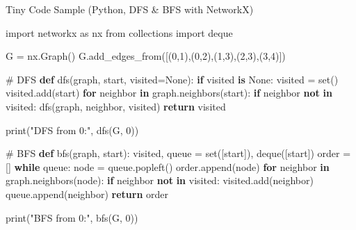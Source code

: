 \documentclass[
  letterpaper,
  DIV=11,
  numbers=noendperiod]{scrreprt}
\newenvironment{Shaded}{\begin{snugshade}}{\end{snugshade}}
\newcommand{\BuiltInTok}[1]{\textcolor[rgb]{0.00,0.23,0.31}{#1}}
\newcommand{\CommentTok}[1]{\textcolor[rgb]{0.37,0.37,0.37}{#1}}
\newcommand{\ControlFlowTok}[1]{\textcolor[rgb]{0.00,0.23,0.31}{\textbf{#1}}}
\newcommand{\DecValTok}[1]{\textcolor[rgb]{0.68,0.00,0.00}{#1}}
\newcommand{\ImportTok}[1]{\textcolor[rgb]{0.00,0.46,0.62}{#1}}
\newcommand{\KeywordTok}[1]{\textcolor[rgb]{0.00,0.23,0.31}{\textbf{#1}}}
\newcommand{\NormalTok}[1]{\textcolor[rgb]{0.00,0.23,0.31}{#1}}
\newcommand{\OperatorTok}[1]{\textcolor[rgb]{0.37,0.37,0.37}{#1}}
\newcommand{\StringTok}[1]{\textcolor[rgb]{0.13,0.47,0.30}{#1}}
\newcommand{\VariableTok}[1]{\textcolor[rgb]{0.07,0.07,0.07}{#1}}
\begin{document}
Tiny Code Sample (Python, DFS \& BFS with NetworkX)

\begin{Shaded}
\begin{Highlighting}[]
\ImportTok{import}\NormalTok{ networkx }\ImportTok{as}\NormalTok{ nx}
\ImportTok{from}\NormalTok{ collections }\ImportTok{import}\NormalTok{ deque}

\NormalTok{G }\OperatorTok{=}\NormalTok{ nx.Graph()}
\NormalTok{G.add\_edges\_from([(}\DecValTok{0}\NormalTok{,}\DecValTok{1}\NormalTok{),(}\DecValTok{0}\NormalTok{,}\DecValTok{2}\NormalTok{),(}\DecValTok{1}\NormalTok{,}\DecValTok{3}\NormalTok{),(}\DecValTok{2}\NormalTok{,}\DecValTok{3}\NormalTok{),(}\DecValTok{3}\NormalTok{,}\DecValTok{4}\NormalTok{)])}

\CommentTok{\# DFS}
\KeywordTok{def}\NormalTok{ dfs(graph, start, visited}\OperatorTok{=}\VariableTok{None}\NormalTok{):}
    \ControlFlowTok{if}\NormalTok{ visited }\KeywordTok{is} \VariableTok{None}\NormalTok{:}
\NormalTok{        visited }\OperatorTok{=} \BuiltInTok{set}\NormalTok{()}
\NormalTok{    visited.add(start)}
    \ControlFlowTok{for}\NormalTok{ neighbor }\KeywordTok{in}\NormalTok{ graph.neighbors(start):}
        \ControlFlowTok{if}\NormalTok{ neighbor }\KeywordTok{not} \KeywordTok{in}\NormalTok{ visited:}
\NormalTok{            dfs(graph, neighbor, visited)}
    \ControlFlowTok{return}\NormalTok{ visited}

\BuiltInTok{print}\NormalTok{(}\StringTok{"DFS from 0:"}\NormalTok{, dfs(G, }\DecValTok{0}\NormalTok{))}

\CommentTok{\# BFS}
\KeywordTok{def}\NormalTok{ bfs(graph, start):}
\NormalTok{    visited, queue }\OperatorTok{=} \BuiltInTok{set}\NormalTok{([start]), deque([start])}
\NormalTok{    order }\OperatorTok{=}\NormalTok{ []}
    \ControlFlowTok{while}\NormalTok{ queue:}
\NormalTok{        node }\OperatorTok{=}\NormalTok{ queue.popleft()}
\NormalTok{        order.append(node)}
        \ControlFlowTok{for}\NormalTok{ neighbor }\KeywordTok{in}\NormalTok{ graph.neighbors(node):}
            \ControlFlowTok{if}\NormalTok{ neighbor }\KeywordTok{not} \KeywordTok{in}\NormalTok{ visited:}
\NormalTok{                visited.add(neighbor)}
\NormalTok{                queue.append(neighbor)}
    \ControlFlowTok{return}\NormalTok{ order}

\BuiltInTok{print}\NormalTok{(}\StringTok{"BFS from 0:"}\NormalTok{, bfs(G, }\DecValTok{0}\NormalTok{))}
\end{Highlighting}
\end{Shaded}
\end{document}
